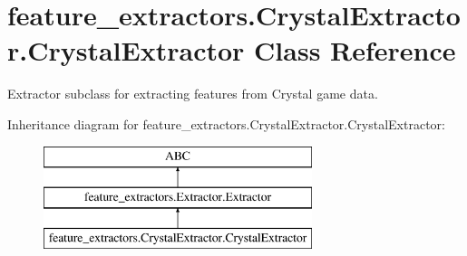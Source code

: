 \hypertarget{classfeature__extractors_1_1_crystal_extractor_1_1_crystal_extractor}{}\section{feature\+\_\+extractors.\+Crystal\+Extractor.\+Crystal\+Extractor Class Reference}
\label{classfeature__extractors_1_1_crystal_extractor_1_1_crystal_extractor}


Extractor subclass for extracting features from Crystal game data.  


Inheritance diagram for feature\+\_\+extractors.\+Crystal\+Extractor.\+Crystal\+Extractor\+:\begin{figure}[H]
\begin{center}
\leavevmode
\includegraphics[height=3.000000cm]{classfeature__extractors_1_1_crystal_extractor_1_1_crystal_extractor}
\end{center}
\end{figure}
